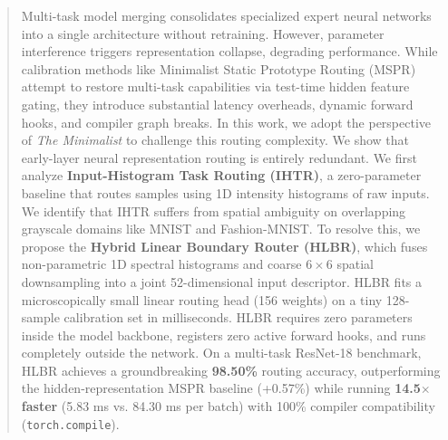 \documentclass{article}
\theoremstyle{plain}
\theoremstyle{definition}
\theoremstyle{remark}
\begin{document}

\printAffiliationsAndNotice{\icmlequalcontrib}

\begin{abstract}
Multi-task model merging consolidates specialized expert neural networks into a single architecture without retraining. However, parameter interference triggers representation collapse, degrading performance. While calibration methods like Minimalist Static Prototype Routing (MSPR) attempt to restore multi-task capabilities via test-time hidden feature gating, they introduce substantial latency overheads, dynamic forward hooks, and compiler graph breaks. In this work, we adopt the perspective of \textit{The Minimalist} to challenge this routing complexity. We show that early-layer neural representation routing is entirely redundant. We first analyze \textbf{Input-Histogram Task Routing (IHTR)}, a zero-parameter baseline that routes samples using 1D intensity histograms of raw inputs. We identify that IHTR suffers from spatial ambiguity on overlapping grayscale domains like MNIST and Fashion-MNIST. To resolve this, we propose the \textbf{Hybrid Linear Boundary Router (HLBR)}, which fuses non-parametric 1D spectral histograms and coarse $6\times 6$ spatial downsampling into a joint 52-dimensional input descriptor. HLBR fits a microscopically small linear routing head (156 weights) on a tiny 128-sample calibration set in milliseconds. HLBR requires zero parameters inside the model backbone, registers zero active forward hooks, and runs completely outside the network. On a multi-task ResNet-18 benchmark, HLBR achieves a groundbreaking \textbf{98.50\%} routing accuracy, outperforming the hidden-representation MSPR baseline (+0.57\%) while running \textbf{14.5$\times$ faster} (5.83 ms vs. 84.30 ms per batch) with 100\% compiler compatibility (\texttt{torch.compile}).
\end{abstract}
\end{document}
